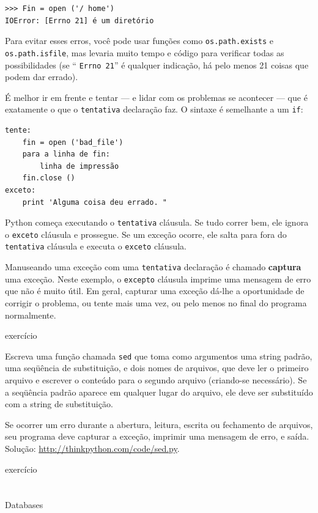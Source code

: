 \documentclass[10pt]{book}
\begin{document}
\begin{v erbatim}
\begin{verbatim}
>>> Fin = open ('/ home')
IOError: [Errno 21] é um diretório
\end{verbatim}
%
Para evitar esses erros, você pode usar funções como {\tt os.path.exists}
e {\tt os.path.isfile}, mas levaria muito tempo e código
para verificar todas as possibilidades (se `` {\tt Errno 21}'' é qualquer
indicação, há pelo menos 21 coisas que podem dar errado).

É melhor ir em frente e tentar --- e lidar com os problemas se
acontecer --- que é exatamente o que o {\tt tentativa} declaração faz. O
sintaxe é semelhante a um {\tt if}:

\begin{verbatim}
tente:    
    fin = open ('bad_file')
    para a linha de fin:
        linha de impressão
    fin.close ()
exceto:
    print 'Alguma coisa deu errado. "
\end{verbatim}
%
Python começa executando o {\tt tentativa} cláusula. Se tudo correr
bem, ele ignora o {\tt exceto} cláusula e prossegue. Se um
exceção ocorre, ele salta para fora do {\tt tentativa} cláusula e
executa o {\tt exceto} cláusula.

Manuseando uma exceção com uma {\tt tentativa} declaração é chamado {\bf
captura} uma exceção. Neste exemplo, o {\tt excepto} cláusula
imprime uma mensagem de erro que não é muito útil. Em geral,
capturar uma exceção dá-lhe a oportunidade de corrigir o problema, ou tente
mais uma vez, ou pelo menos no final do programa normalmente.

\begin{} exercício

Escreva uma função chamada {\tt sed} que toma como argumentos uma string padrão,
uma seqüência de substituição, e dois nomes de arquivos, que deve ler o primeiro arquivo
e escrever o conteúdo para o segundo arquivo (criando-se
necessário). Se a seqüência padrão aparece em qualquer lugar do arquivo, ele
deve ser substituído com a string de substituição.

Se ocorrer um erro durante a abertura, leitura, escrita ou fechamento de arquivos,
seu programa deve capturar a exceção, imprimir uma mensagem de erro, e
saída. Solução: \url{http://thinkpython.com/code/sed.py}.

\end{} exercício


\section{} Databases


\end{v erbatim}
\end{document}
